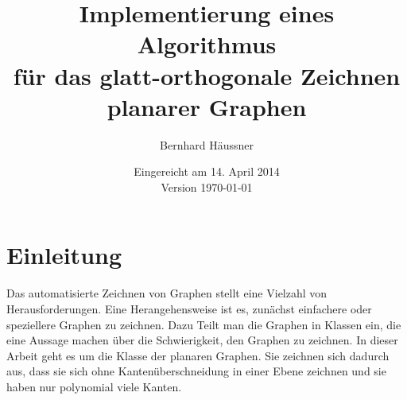 \documentclass[a4paper]{scrreprt}
\theoremstyle{definition}
\begin{document}


\subject{Bachelorarbeit}
\title{Implementierung eines Algorithmus\\ für das glatt-orthogonale Zeichnen \\ planarer Graphen} %
\author{Bernhard Häussner} %
\date{Eingereicht am 14. April 2014 \\ Version \today} %
\titlehead{Julius-Maximilians-Universität Würzburg\\
Institut für Informatik\\
Lehrstuhl für Informatik I\\
Effiziente Algorithmen und wissensbasierte Systeme}
\publishers{Betreuer:\\
Prof.\ Dr.\ Alexander Wolff\\
Dipl.-Inf.\ Philipp Kindermann} %
\maketitle
\tableofcontents








\chapter{Einleitung}


Das automatisierte Zeichnen von Graphen stellt eine Vielzahl von Herausforderungen. 
Eine Herangehensweise ist es, zunächst einfachere oder speziellere Graphen zu zeichnen. 
Dazu Teilt man die Graphen in Klassen ein, die eine Aussage machen über die Schwierigkeit, den Graphen zu zeichnen. 
In dieser Arbeit geht es um die Klasse der planaren Graphen. Sie zeichnen sich dadurch aus, dass sie sich ohne Kantenüberschneidung in einer Ebene zeichnen und sie haben nur polynomial viele Kanten. 
\end{document}
